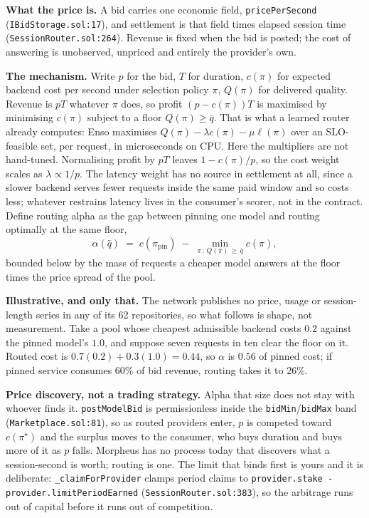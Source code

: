 \documentclass[10pt,a4paper]{article}
\newcommand{\code}[1]{\texttt{\small #1}}
\begin{document}
\sloppy


\noindent\textbf{What the price is.}
A bid carries one economic field, \code{pricePerSecond} (\code{IBidStorage.sol:17}), and
settlement is that field times elapsed session time (\code{SessionRouter.sol:264}). Revenue is
fixed when the bid is posted; the cost of answering is unobserved, unpriced and entirely the
provider's own.

\vspace{0.35ex}
\noindent\textbf{The mechanism.}
Write $p$ for the bid, $T$ for duration, $c(\pi)$ for expected backend cost per second under
selection policy $\pi$, $Q(\pi)$ for delivered quality. Revenue is $pT$ whatever $\pi$ does, so
profit $(p-c(\pi))T$ is maximised by minimising $c(\pi)$ subject to a floor $Q(\pi)\ge\bar q$.
That is what a learned router already computes: Enso maximises
$Q(\pi)-\lambda c(\pi)-\mu\ell(\pi)$ over an SLO-feasible set, per request, in microseconds on
CPU. Here the multipliers are not hand-tuned. Normalising profit by $pT$ leaves $1-c(\pi)/p$, so
the cost weight scales as $\lambda\propto 1/p$. The latency weight has no source in settlement at
all, since a slower backend serves fewer requests inside the same paid window and so costs less;
whatever restrains latency lives in the consumer's scorer, not in the contract. Define routing
alpha as the gap between pinning one model and routing optimally at the same floor,
\[
  \alpha(\bar q) \;=\; c(\pi_{\mathrm{pin}}) \;-\; \min_{\pi\,:\,Q(\pi)\,\ge\,\bar q} c(\pi),
\]
bounded below by the mass of requests a cheaper model answers at the floor times the price spread
of the pool.

\vspace{0.35ex}
\noindent\textbf{Illustrative, and only that.}
The network publishes no price, usage or session-length series in any of its 62 repositories, so
what follows is shape, not measurement. Take a pool whose cheapest admissible backend costs $0.2$
against the pinned model's $1.0$, and suppose seven requests in ten clear the floor on it. Routed
cost is $0.7(0.2)+0.3(1.0)=0.44$, so $\alpha$ is $0.56$ of pinned cost; if pinned service consumes
$60\%$ of bid revenue, routing takes it to $26\%$.

\vspace{0.35ex}
\noindent\textbf{Price discovery, not a trading strategy.}
Alpha that size does not stay with whoever finds it. \code{postModelBid} is permissionless inside
the \code{bidMin}/\code{bidMax} band (\code{Marketplace.sol:81}), so as routed providers enter,
$p$ is competed toward $c(\pi^\star)$ and the surplus moves to the consumer, who buys duration and
buys more of it as $p$ falls. Morpheus has no process today that discovers what a session-second
is worth; routing is one. The limit that binds first is yours and it is deliberate: \code{\_claimForProvider} clamps period claims to
\code{provider.stake - provider.limitPeriodEarned} (\code{SessionRouter.sol:383}), so the
arbitrage runs out of capital before it runs out of competition.
\end{document}

